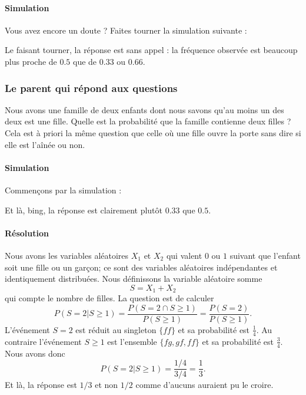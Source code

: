 \paragraph{Simulation}

Vous avez encore un doute ? Faites tourner la simulation suivante :


Le faisant tourner, la réponse est sans appel : la fréquence observée est beaucoup plus proche de \( 0.5\) que de \( 0.33\) ou \( 0.66\).

\subsubsection{Le parent qui répond aux questions}

Nous avons une famille de deux enfants dont nous savons qu'au moins un des deux est une fille. Quelle est la probabilité que la famille contienne deux filles ? Cela est à priori la même question que celle où une fille ouvre la porte sans dire si elle est l'aînée ou non.

\paragraph{Simulation}

Commençons par la simulation :



Et là, bing, la réponse est clairement plutôt \( 0.33\) que \( 0.5\).

\paragraph{Résolution}

Nous avons les variables aléatoires \( X_1\) et \( X_2\) qui valent \( 0\) ou \( 1\) suivant que l'enfant soit une fille ou un garçon; ce sont des variables aléatoires indépendantes et identiquement distribuées. Nous définissons la variable aléatoire somme
\begin{equation}
    S=X_1+X_2
\end{equation}
qui compte le nombre de filles. La question est de calculer
\begin{equation}
    P( S=2|S\geq 1 )=\frac{ P(S=2\cap S\geq 1) }{ P(S\geq 1) }=\frac{ P(S=2) }{ P(S\geq 1) }.
\end{equation}
L'événement \( S=2\) est réduit au singleton \( \{ ff \}\) et sa probabilité est \( \frac{1}{ 4 }\). Au contraire l'événement \( S\geq 1\) est l'ensemble \( \{ fg,gf,ff \}\) et sa probabilité est \( \frac{ 3 }{ 4 }\). Nous avons donc
\begin{equation}
    P( S=2|S\geq 1 )=\frac{ 1/4 }{ 3/4 }=\frac{1}{ 3 }.
\end{equation}
Et là, la réponse est \( 1/3\) et non \( 1/2\) comme d'aucuns auraient pu le croire.

